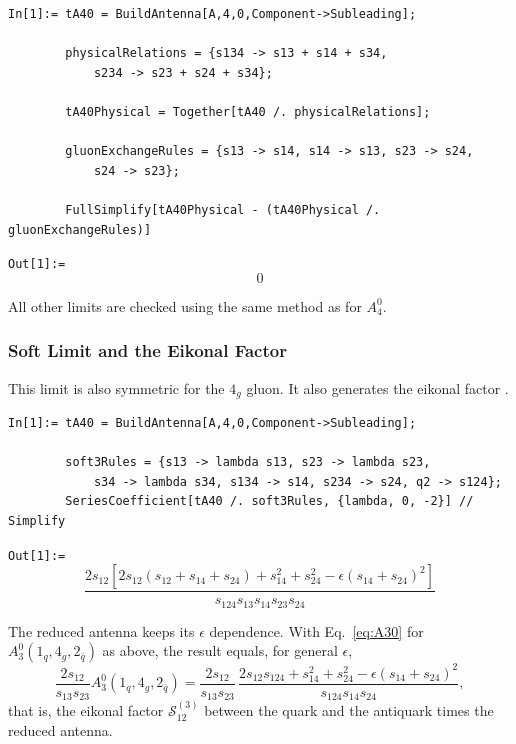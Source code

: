 \begin{mdframed}[backgroundcolor=gray!10, linewidth=0pt]
\begin{lstlisting}
In[1]:= tA40 = BuildAntenna[A,4,0,Component->Subleading];

        physicalRelations = {s134 -> s13 + s14 + s34,
            s234 -> s23 + s24 + s34};

        tA40Physical = Together[tA40 /. physicalRelations];

        gluonExchangeRules = {s13 -> s14, s14 -> s13, s23 -> s24,
            s24 -> s23};

        FullSimplify[tA40Physical - (tA40Physical /. gluonExchangeRules)]
\end{lstlisting}
\texttt{Out[1]:=}
    \begin{equation*}
        0
    \end{equation*}
\end{mdframed}

All other limits are checked using the same method as for $A_4^0$.

\subsubsection{Soft Limit and the Eikonal Factor}

This limit is also symmetric for the $4_g$ gluon. It also generates the eikonal factor \cite{Gehrmann-DeRidder:2005btv}.

\begin{mdframed}[backgroundcolor=gray!10, linewidth=0pt]
\begin{lstlisting}
In[1]:= tA40 = BuildAntenna[A,4,0,Component->Subleading];

        soft3Rules = {s13 -> lambda s13, s23 -> lambda s23,
            s34 -> lambda s34, s134 -> s14, s234 -> s24, q2 -> s124};
        SeriesCoefficient[tA40 /. soft3Rules, {lambda, 0, -2}] // Simplify
\end{lstlisting}
\texttt{Out[1]:=}
    \begin{equation*}
        \frac{2s_{12}\left[2s_{12}(s_{12}+s_{14}+s_{24})+s_{14}^2+s_{24}^2-\epsilon(s_{14}+s_{24})^2\right]}{s_{124}s_{13}s_{14}s_{23}s_{24}}
    \end{equation*}
\end{mdframed}
The reduced antenna keeps its $\epsilon$ dependence. With Eq.~\eqref{eq:A30} for $A_3^0(1_q,4_g,2_{\bar q})$ as above, the
result equals, for general $\epsilon$,
\begin{equation}
    \frac{2s_{12}}{s_{13}s_{23}}A_3^0(1_q,4_g,2_{\bar q})=\frac{2s_{12}}{s_{13}s_{23}}\,
    \frac{2s_{12}s_{124}+s_{14}^2+s_{24}^2-\epsilon(s_{14}+s_{24})^2}{s_{124}s_{14}s_{24}},
\end{equation}
that is, the eikonal factor $\mathcal S_{12}^{(3)}$ between the quark and the antiquark times the reduced antenna.


